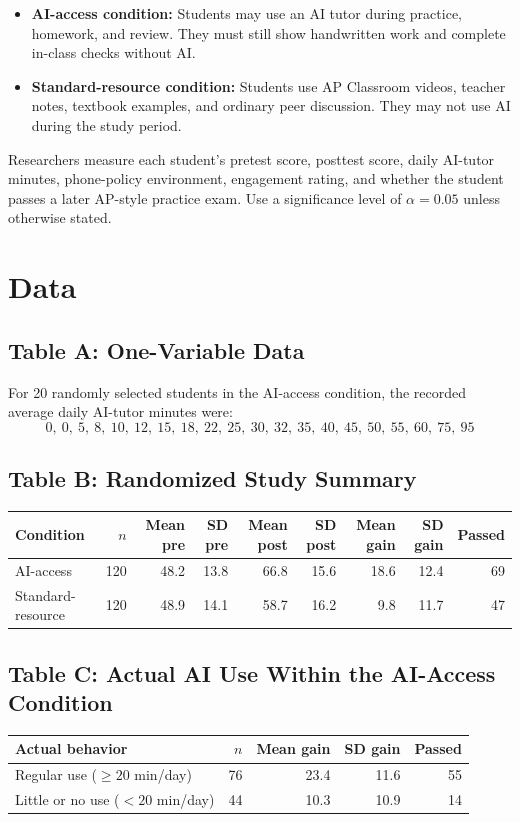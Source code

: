 \documentclass[11pt]{article}
\begin{document}
\begin{itemize}[leftmargin=*]
  \item \textbf{AI-access condition:} Students may use an AI tutor
  during practice, homework, and review. They must still show
  handwritten work and complete in-class checks without AI.
  \item \textbf{Standard-resource condition:} Students use AP
  Classroom videos, teacher notes, textbook examples, and ordinary
  peer discussion. They may not use AI during the study period.
\end{itemize}

Researchers measure each student's pretest score, posttest score,
daily AI-tutor minutes, phone-policy environment, engagement rating,
and whether the student passes a later AP-style practice exam. Use a
significance level of $\alpha = 0.05$ unless otherwise stated.

\section{Data}

\subsection*{Table A: One-Variable Data}
For 20 randomly selected students in the AI-access condition, the
recorded average daily AI-tutor minutes were:
\[
0,\ 0,\ 5,\ 8,\ 10,\ 12,\ 15,\ 18,\ 22,\ 25,\ 30,\ 32,\ 35,\ 40,\ 45,\ 50,\ 55,\ 60,\ 75,\ 95
\]

\subsection*{Table B: Randomized Study Summary}
\begin{center}
\small
\begin{tabular}{lrrrrrrrr}
\toprule
Condition & $n$ & Mean pre & SD pre & Mean post & SD post & Mean gain & SD gain & Passed \\
\midrule
AI-access          & 120 & 48.2 & 13.8 & 66.8 & 15.6 & 18.6 & 12.4 & 69 \\
Standard-resource  & 120 & 48.9 & 14.1 & 58.7 & 16.2 &  9.8 & 11.7 & 47 \\
\bottomrule
\end{tabular}
\end{center}

\subsection*{Table C: Actual AI Use Within the AI-Access Condition}
\begin{center}
\small
\begin{tabular}{lrrrr}
\toprule
Actual behavior & $n$ & Mean gain & SD gain & Passed \\
\midrule
Regular use ($\geq 20$ min/day)        & 76 & 23.4 & 11.6 & 55 \\
Little or no use ($< 20$ min/day)      & 44 & 10.3 & 10.9 & 14 \\
\bottomrule
\end{tabular}
\end{center}
\end{document}
